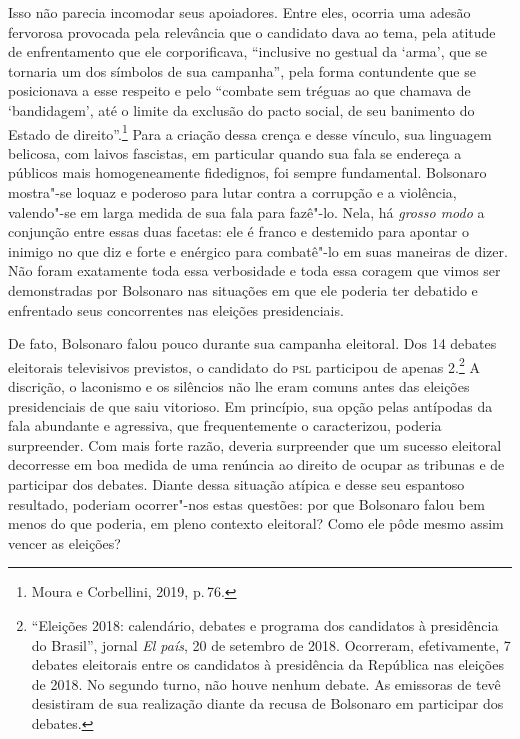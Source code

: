Isso não parecia incomodar seus apoiadores. Entre eles, ocorria uma
adesão fervorosa provocada pela relevância que o candidato dava ao tema,
pela atitude de enfrentamento que ele corporificava, ``inclusive no
gestual da `arma', que se tornaria um dos símbolos de sua campanha'',
pela forma contundente que se posicionava a esse respeito e pelo
``combate sem tréguas ao que chamava de `bandidagem', até o limite da
exclusão do pacto social, de seu banimento do Estado de
direito''.\footnote{Moura e Corbellini, 2019, p.\,76.} Para a criação
dessa crença e desse vínculo, sua linguagem belicosa, com laivos
fascistas, em particular quando sua fala se endereça a públicos mais
homogeneamente fidedignos, foi sempre fundamental. Bolsonaro mostra"-se
loquaz e poderoso para lutar contra a corrupção e a violência,
valendo"-se em larga medida de sua fala para fazê"-lo. Nela, há
\emph{grosso modo} a conjunção entre essas duas facetas: ele é franco e
destemido para apontar o inimigo no que diz e forte e enérgico para
combatê"-lo em suas maneiras de dizer. Não foram exatamente toda essa
verbosidade e toda essa coragem que vimos ser demonstradas por Bolsonaro
nas situações em que ele poderia ter debatido e enfrentado seus
concorrentes nas eleições presidenciais.

De fato, Bolsonaro falou pouco durante sua campanha eleitoral. Dos 14
debates eleitorais televisivos previstos, o candidato do \textsc{psl} participou
de apenas 2.\footnote{``Eleições 2018: calendário, debates e programa dos candidatos à presidência do Brasil'', jornal \emph{El país}, 20 de setembro de 2018. Ocorreram, efetivamente, 7 debates
  eleitorais entre os candidatos à presidência da República nas eleições
  de 2018. No segundo turno, não houve nenhum debate. As emissoras de
  tevê desistiram de sua realização diante da recusa de Bolsonaro em
  participar dos debates.} A discrição, o laconismo e os silêncios não
lhe eram comuns antes das eleições presidenciais de que saiu vitorioso.
Em princípio, sua opção pelas antípodas da fala abundante e agressiva,
que frequentemente o caracterizou, poderia surpreender. Com mais forte
razão, deveria surpreender que um sucesso eleitoral decorresse em boa
medida de uma renúncia ao direito de ocupar as tribunas e de participar
dos debates. Diante dessa situação atípica e desse seu espantoso
resultado, poderiam ocorrer"-nos estas questões: por que Bolsonaro falou
bem menos do que poderia, em pleno contexto eleitoral? Como ele pôde
mesmo assim vencer as eleições?

